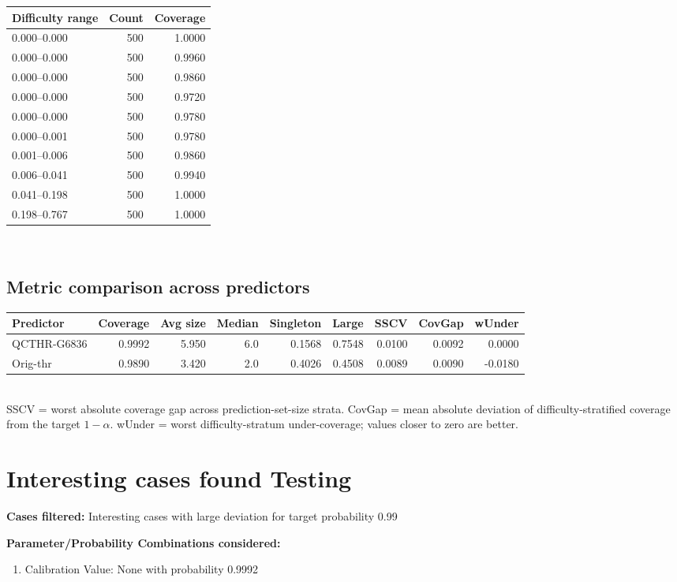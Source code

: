 \documentclass[parskip=half]{scrartcl}
\begin{document}
\begin{tabular}{l r r}
\hline
Difficulty range & Count & Coverage \\
\hline
0.000--0.000 & 500 & 1.0000 \\
0.000--0.000 & 500 & 0.9960 \\
0.000--0.000 & 500 & 0.9860 \\
0.000--0.000 & 500 & 0.9720 \\
0.000--0.000 & 500 & 0.9780 \\
0.000--0.001 & 500 & 0.9780 \\
0.001--0.006 & 500 & 0.9860 \\
0.006--0.041 & 500 & 0.9940 \\
0.041--0.198 & 500 & 1.0000 \\
0.198--0.767 & 500 & 1.0000 \\
\hline
\end{tabular}\\[0.5em]
\subsection{Metric comparison across predictors}
\begin{tabular}{l r r r r r r r r}
\hline
Predictor & Coverage & Avg size & Median & Singleton & Large & SSCV & CovGap & wUnder \\
\hline
QCTHR-G6836 & 0.9992 & 5.950 & 6.0 & 0.1568 & 0.7548 & 0.0100 & 0.0092 & 0.0000 \\
Orig-thr & 0.9890 & 3.420 & 2.0 & 0.4026 & 0.4508 & 0.0089 & 0.0090 & -0.0180 \\
\hline
\end{tabular}\\[0.5em]
\textsf{\scriptsize SSCV = worst absolute coverage gap across prediction-set-size strata. CovGap = mean absolute deviation of difficulty-stratified coverage from the target $1-\alpha$. wUnder = worst difficulty-stratum under-coverage; values closer to zero are better.}\\
\section{Interesting cases found Testing}
\textbf{Cases filtered:} Interesting cases with large deviation for target probability 0.99


\textbf{Parameter/Probability Combinations considered:}\begin{enumerate}
\item Calibration Value: None with probability 0.9992
\end{enumerate}
        
\end{document}
